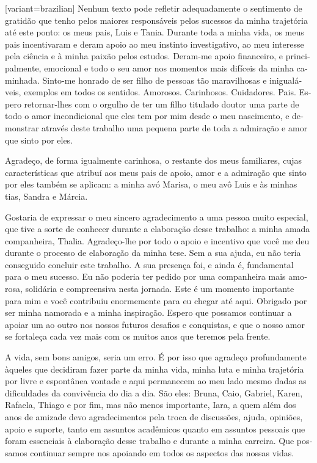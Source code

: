 \documentclass[12pt, twoside]{report}
\begin{document}
\begin{portuguese}[variant=brazilian]
  Nenhum texto pode refletir adequadamente o sentimento de gratidão que tenho pelos maiores responsáveis pelos sucessos da minha trajetória até este ponto: os meus pais, Luis e Tania. Durante toda a minha vida, os meus pais incentivaram e deram apoio ao meu instinto investigativo, ao meu interesse pela ciência e à minha paixão pelos estudos. Deram-me apoio financeiro, e principalmente, emocional e todo o seu amor nos momentos mais difíceis da minha caminhada. Sinto-me honrado de ser filho de pessoas tão maravilhosas e inigualáveis, exemplos em todos os sentidos. Amorosos. Carinhosos. Cuidadores. Pais. Espero retornar-lhes com o orgulho de ter um filho titulado doutor uma parte de todo o amor incondicional que eles tem por mim desde o meu nascimento, e demonstrar através deste trabalho uma pequena parte de toda a admiração e amor que sinto por eles.

  Agradeço, de forma igualmente carinhosa, o restante dos meus familiares, cujas características que atribuí aos meus pais de apoio, amor e a admiração que sinto por eles também se aplicam: a minha avó Marisa, o meu avô Luis e às minhas tias, Sandra e Márcia.

  Gostaria de expressar o meu sincero agradecimento a uma pessoa muito especial, que tive a sorte de conhecer durante a elaboração desse trabalho: a minha amada companheira, Thalia. Agradeço-lhe por todo o apoio e incentivo que você me deu durante o processo de elaboração da minha tese. Sem a sua ajuda, eu não teria conseguido concluir este trabalho. A sua presença foi, e ainda é, fundamental para o meu sucesso. Eu não poderia ter pedido por uma companheira mais amorosa, solidária e compreensiva nesta jornada. Este é um momento importante para mim e você contribuiu enormemente para eu chegar até aqui. Obrigado por ser minha namorada e a minha inspiração. Espero que possamos continuar a apoiar um ao outro nos nossos futuros desafios e conquistas, e que o nosso amor se fortaleça cada vez mais com os muitos anos que teremos pela frente.

  A vida, sem bons amigos, seria um erro. É por isso que agradeço profundamente àqueles que decidiram fazer parte da minha vida, minha luta e minha trajetória por livre e espontânea vontade e aqui permanecem ao meu lado mesmo dadas as dificuldades da convivência do dia a dia. São eles: Bruna, Caio, Gabriel, Karen, Rafaela, Thiago e por fim, mas não menos importante, Iara, a quem além dos anos de amizade devo agradecimentos pela troca de discussões, ajuda, opiniões, apoio e suporte, tanto em assuntos acadêmicos quanto em assuntos pessoais que foram essenciais à elaboração desse trabalho e durante a minha carreira. Que possamos continuar sempre nos apoiando em todos os aspectos das nossas vidas.


\end{portuguese}
\end{document}
